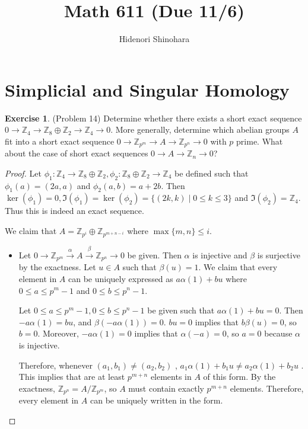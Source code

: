 \documentclass[12pt, psamsfonts]{amsart}
\theoremstyle{definition}
\newtheorem*{exer}{Exercise}
\theoremstyle{remark}
\numberwithin{equation}{section}
\begin{document}
\title{Math 611 (Due 11/6)}
\author{Hidenori Shinohara}
\maketitle

\section{Simplicial and Singular Homology}

\begin{exer}{(Problem 14)}
  Determine whether there exists a short exact sequence $0 \rightarrow \mathbb{Z}_4 \rightarrow \mathbb{Z}_8 \oplus \mathbb{Z}_2 \rightarrow \mathbb{Z}_4 \rightarrow 0$.
  More generally, determine which abelian groups $A$ fit into a short exact sequence $0 \rightarrow \mathbb{Z}_{p^m} \rightarrow A \rightarrow \mathbb{Z}_{p^n} \rightarrow 0$ with $p$ prime.
  What about the case of short exact sequences $0 \rightarrow A \rightarrow \mathbb{Z}_n \rightarrow 0$?
\end{exer}

\begin{proof}
  Let $\phi_1: \mathbb{Z}_4 \rightarrow \mathbb{Z}_8 \oplus \mathbb{Z}_2, \phi_2: \mathbb{Z}_8 \oplus \mathbb{Z}_2 \rightarrow \mathbb{Z}_4$ be defined such that $\phi_1(a) = (2a, a)$ and $\phi_2(a, b) = a + 2b$.
  Then $\ker(\phi_1) = 0, \Im(\phi_1) = \ker(\phi_2) = \{ (2k, k) \mid 0 \leq k \leq 3 \}$ and $\Im(\phi_2) = \mathbb{Z}_4$.
  Thus this is indeed an exact sequence.

  We claim that $A = \mathbb{Z}_{p^i} \oplus \mathbb{Z}_{p^{m + n - i}}$ where $\max\{ m, n \} \leq i$.
  \begin{itemize}
    \item
      Let $0 \rightarrow \mathbb{Z}_{p^m} \xrightarrow{\alpha} A \xrightarrow{\beta} \mathbb{Z}_{p^n} \rightarrow 0$ be given.
      Then $\alpha$ is injective and $\beta$ is surjective by the exactness.
      Let $u \in A$ such that $\beta(u) = 1$.
      We claim that every element in $A$ can be uniquely expressed as $a\alpha(1) + bu$ where $0 \leq a \leq p^m - 1$ and $0 \leq b \leq p^n - 1$.

      Let $0 \leq a \leq p^m - 1, 0 \leq b \leq p^n - 1$ be given such that $a\alpha(1) + bu = 0$.
      Then $-a\alpha(1) = bu$, and $\beta(-a\alpha(1)) = 0$.
      $bu = 0$ implies that $b\beta(u) = 0$, so $b = 0$.
      Moreover, $-a\alpha(1) = 0$ implies that $\alpha(-a) = 0$, so $a = 0$ because $\alpha$ is injective.

      Therefore, whenever $(a_1, b_1) \ne (a_2, b_2)$ , $a_1\alpha(1) + b_1u \ne a_2\alpha(1) + b_2u$ .
      This implies that are at least $p^{m + n}$ elements in $A$ of this form.
      By the exactness, $\mathbb{Z}_{p^n} = A / \mathbb{Z}_{p^m}$, so $A$ must contain exactly $p^{m + n}$ elements.
      Therefore, every element in $A$ can be uniquely written in the form.
  \end{itemize}

\end{proof}
\end{document}
